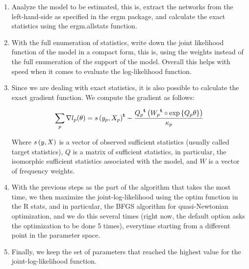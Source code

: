 \documentclass[12pt]{article}
\begin{document}
\begin{enumerate}
    \item Analyze the model to be estimated, this is, extract the networks from the left-hand-side as specified in the ergm package, and calculate the exact statistics using the ergm.allstats function.
    \item With the full enumeration of statistics, write down the joint likelihood function of the model in a compact form, this is, using the weights instead of the full enumeration of the support of the model. Overall this helps with speed when it comes to evaluate the log-likelihood function.
    \item Since we are dealing with exact statistics, it is also possible to calculate the exact gradient function. We compute the gradient as follows:
    
    \begin{equation}
    \sum_{p}\nabla l_p(\theta) = {s\left(y_p, X_p\right)}^\mathbf{t} - \frac{{Q_p}^\mathbf{t}\left({W_p}^\mathbf{t} \circ \mbox{exp}\left\{Q_p \theta\right\}\right)}{\kappa_p}
    \end{equation}
    
    Where $s\left(y, X\right)$ is a vector of observed sufficient statistics (usually called target statistics), $Q$ is a matrix of sufficient statistics, in particular, the isomorphic sufficient statistics associated with the model, and $W$ is a vector of frequency weights.
    
    \item With the previous steps as the part of the algorithm that takes the most time, we then maximize the joint-log-likelihood using the optim function in the R stats, and in particular, the BFGS algorithm for quasi-Newtonian optimization, and we do this several times (right now, the default option asks the optimization to be done 5 times), everytime starting from a different point in the parameter space.
    
    \item Finally, we keep the set of parameters that reached the highest value for the joint-log-likelihood function.
\end{enumerate}
\end{document}
